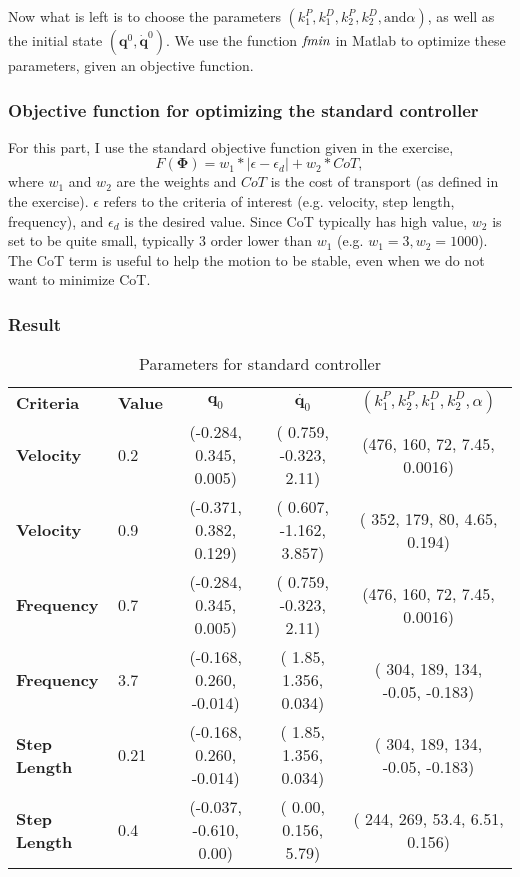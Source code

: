 Now what is left is to choose the parameters $(k_1^P, k_1^D, k_2^P, k_2^D, \text{and} \alpha)$, as well as the initial state $(\bm{q}^0, \dot{\bm{q}}^0)$. We use the function $\emph{fmin}$ in Matlab to optimize these parameters, given an objective function. 

\subsubsection{Objective function for optimizing the standard controller}
For this part, I use the standard objective function given in the exercise,
\begin{equation}
F(\bm{\Phi}) = w_1*|\epsilon - \epsilon_d| + w_2*CoT,
\end{equation}
where $w_1$ and $w_2$ are the weights and $CoT$ is the cost of transport (as defined in the exercise). $\epsilon$ refers to the criteria of interest (e.g. velocity, step length, frequency), and $\epsilon_d$ is the desired value. Since CoT typically has high value, $w_2$ is set to be quite small, typically 3 order lower than $w_1$ (e.g. $w_1 = 3, w_2 = 1000$). The CoT term is useful to help the motion to be stable, even when we do not want to minimize CoT. 

\subsubsection{Result}



\renewcommand{\arraystretch}{1.}
\begin{table}[!t]
	\centering    
      \caption{Parameters for standard controller}
      \label{tab:standard_result}
		
	\begin{tabular}{l l | c  c  c }
		\toprule
\bf{Criteria} & \bf{Value} & $\bm{q}_0$ & $\dot{\bm{q}_0}$ & $(k_1^P, k_2^P, k_1^D, k_2^D, \alpha)$ \\
\bf{Velocity} & 0.2 & (-0.284, 0.345, 0.005) & ( 0.759, -0.323, 2.11) & (476, 160, 72, 7.45, 0.0016) \\
\bf{Velocity} & 0.9 & (-0.371,   0.382,   0.129) & (  0.607,  -1.162,   3.857) & ( 352, 179,  80,   4.65,   0.194) \\
\bf{Frequency} & 0.7 & (-0.284, 0.345, 0.005) & ( 0.759, -0.323, 2.11) & (476, 160, 72, 7.45, 0.0016) \\
\bf{Frequency} & 3.7 & (-0.168, 0.260, -0.014) & ( 1.85, 1.356, 0.034) & ( 304, 189, 134, -0.05, -0.183) \\
\bf{Step Length} & 0.21 & (-0.168, 0.260, -0.014) & ( 1.85, 1.356, 0.034) & ( 304, 189, 134, -0.05, -0.183) \\
\bf{Step Length} & 0.4 & (-0.037, -0.610, 0.00) & ( 0.00, 0.156, 5.79) & ( 244, 269, 53.4, 6.51, 0.156) 
	\end{tabular}
\end{table}